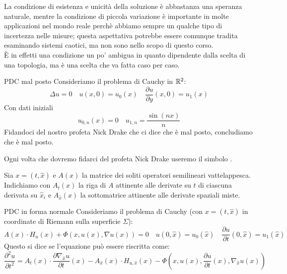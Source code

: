\documentclass{article}
\begin{document}
\begin{remark}{}{}
    La condizione di esistenza e unicità della soluzione è abbastanza una speranza naturale, mentre la condizione di piccola variazione è importante in molte applicazioni nel mondo reale perchè abbiamo sempre un qualche tipo di incertezza nelle misure; questa aspettativa potrebbe essere comunque tradita esaminando sistemi caotici, ma non sono nello scopo di questo corso.\\
    È in effetti una condizione un po' ambigua in quanto dipendente dalla scelta di una topologia, ma è una scelta che va fatta caso per caso.
\end{remark}

\begin{example}{PDC mal posto}{}
    Consideriamo il problema di Cauchy in $\mathbb{R}^2$:
    \[\Delta u = 0 \quad u(x,0) = u_0(x) \quad \frac{\partial u}{\partial y}(x,0) = u_1(x)\]    
    Con dati iniziali
    \[u_{0,n}(x) = 0 \quad u_{1,n} = \frac{\sin(nx)}{n} \]
    Fidandoci del nostro profeta Nick Drake che ci dice che è mal posto, concludiamo che è mal posto.
\end{example}

\begin{notation}
    Ogni volta che dovremo fidarci del profeta Nick Drake useremo il simbolo \Nick.
\end{notation}

\begin{notation}
    Sia $x = (t,\hat{x})$ e $A(x)$ la matrice dei soliti operatori semilineari vattelappesca.\\
    Indichiamo con $A_t(x)$ la riga di $A$ attinente alle derivate su $t$ di ciascuna derivata su $\hat{x}_i$ e $A_{\hat{x}}(x)$ la sottomatrice attinente alle derivate spaziali miste.
\end{notation}

\begin{definition}{PDC in forma normale}{}
    Consideriamo il problema di Cauchy (con $x = (t,\hat{x})$ in coordinate di Riemann sulla superficie $\Sigma$):
    \[A(x)\cdot H_u(x) + \Phi(x, u(x), \nabla u(x)) = 0 \quad u(0,\hat{x}) = u_0(\hat{x}) \quad \frac{\partial u}{\partial t}(0,\hat{x}) = u_1(\hat{x})\]
    Questo si dice  se l'equazione può essere riscritta come:
    \[\frac{\partial^2 u}{\partial t^2} = A_t(x) \cdot \frac{\partial \nabla_{\hat{x}} u }{\partial t}(x) - A_{\hat{x}}(x) \cdot H_{u,\hat{x}}(x) - \Phi\left(x,u(x),\frac{\partial u}{\partial t}(x), \nabla_{\hat{x}} u(x) \right)\]
\end{definition}
\end{document}
